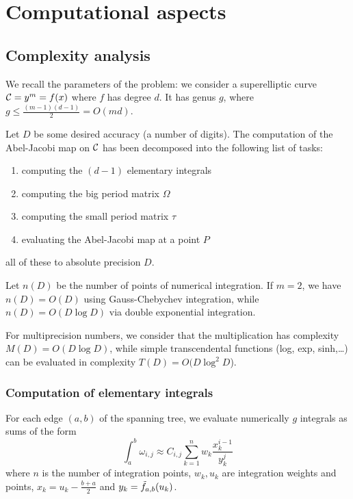 \documentclass[main.tex]{subfiles}
\begin{document}
  \section{Computational aspects}

   \subsection{Complexity analysis}

   We recall the parameters of the problem: we consider a superelliptic curve
   $\mathcal{C}=y^m=f(x)$ where $f$ has degree $d$. It has genus $g$, where
   $g\leq \frac{(m-1)(d-1)}2=O(md)$.

   Let $D$ be some desired accuracy (a number of digits). The computation of
   the Abel-Jacobi map on $\mathcal{C}$ has been decomposed into the
   following list of tasks:
   \begin{enumerate}
       \item computing the $(d-1)$ elementary integrals
       \item computing the big period matrix $\Omega$
       \item computing the small period matrix $\tau$
       \item evaluating the Abel-Jacobi map at a point $P$
   \end{enumerate}
   all of these to absolute precision $D$.

   Let $n(D)$ be the number of points of numerical integration.
   If $m=2$, we have
   $n(D)=O(D)$ using Gauss-Chebychev integration, while $n(D)=O(D\log D)$
   via double exponential integration.

   For multiprecision numbers, we consider that the multiplication has
   complexity $M(D)=O(D\log D)$,
   while simple transcendental functions (log, exp, sinh,\dots) can be evaluated
   in complexity $T(D)=O(D\log^2 D$).

   \subsubsection{Computation of elementary integrals}

   For each edge $(a,b)$ of the spanning tree, we evaluate numerically $g$ integrals
   as sums of the form
   \begin{equation}
       \int_a^b\omega_{i,j} \approx C_{i,j} \sum_{k=1}^n w_k\frac{x_k^{i-1}}{y_k^j}
   \end{equation}
   where $n$ is the number of integration points, $w_k,u_k$ are integration weights and points,
   $x_k=u_k-\frac{b+a}2$ and $y_k=\tilde{f}_{a,b}(u_k)$.
\end{document}
